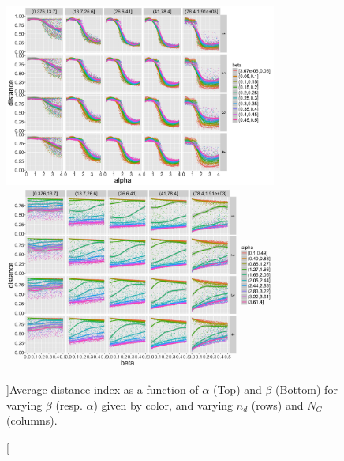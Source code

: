 \begin{figure}
\centering
\includegraphics[width=0.8\textwidth]{Figures/Density/distance_alpha}
\includegraphics[width=0.8\textwidth]{Figures/Density/distance_beta}
\caption[][]{Average distance index as a function of $\alpha$ (Top) and $\beta$ (Bottom) for varying $\beta$ (resp. $\alpha$) given by color, and varying $n_d$ (rows) and $N_G$ (columns).}{}
\label{}
\end{figure}

